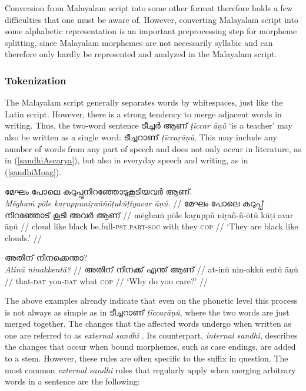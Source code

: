\documentclass[a4paper]{article}
\newcommand{\afx}[1]{\textsc{#1}}
\begin{document}
Conversion from Malayalam script into some other format therefore holds a few difficulties that one must be aware of. However, converting Malayalam script into some alphabetic representation is an important preprocessing step for morpheme splitting, since Malayalam morphemes are not necessarily syllabic and can therefore only hardly be represented and analyzed in the Malayalam script.

\subsubsection{Tokenization}

The Malayalam script generally separates words by whitespaces, just like the Latin script. However, there is a strong tendency to merge adjacent words in writing. Thus, the two-word sentence ടീച്ചർ ആണ് \textit{ṭīccar āṇŭ} `is a teacher' may also be written as a single word: ടീച്ചറാണ് \textit{ṭīccaṟāṇŭ}. This may include any number of words from any part of speech and does not only occur in literature, as in (\ref{sandhiAscarya}), but also in everyday speech and writing, as in (\ref{sandhiMoag}). %

\ex\label{sandhiAscarya}\begingl
\glpreamble മേഘം പോലെ കറുപ്പുനിറഞ്ഞോടുകൂടിയവർ ആണ്. \\
\textit{Mēghaṁ pōle kaṟuppuniṟaññōṭukūṭiyavar āṇŭ.} //
\gla മേഘം പോലെ കറുപ്പ് നിറഞ്ഞോട് കൂടി അവർ ആണ് //
\glb mēghaṁ pōle kaṟuppŭ niṟañ-ñ-ōṭŭ kūṭi avar āṇŭ //
\glc cloud like black be.full-\afx{pst.part}-\afx{soc} with they \afx{cop} //
\glft `They are black like clouds.' \parencite[p.~179]{ascaryacudamani} //
\endgl\xe


\ex\label{sandhiMoag}\begingl
\glpreamble അതിന് നിനക്കെന്താ? \\
\textit{Atinŭ ninakkentā?} //
\gla അതിന് നിനക്ക് എന്ത് ആണ് //
\glb at-inŭ nin-akkŭ entŭ āṇŭ //
\glc that-\afx{dat} you-\afx{dat} what \afx{cop} //
\glft `Why do you care?' \parencite[p.~165]{moag} //
\endgl\xe

The above examples already indicate that even on the phonetic level this process is not always as simple as in ടീച്ചറാണ് \textit{ṭīccaṟāṇŭ}, where the two words are just merged together. The changes that the affected words undergo when written as one are referred to as \textit{external sandhi} \parencite{devadath2014sandhi}. Its counterpart, \textit{internal sandhi}, describes the changes that occur when bound morphemes, such as case endings, are added to a stem. However, these rules are often specific to the suffix in question. The most common \textit{external sandhi} rules that regularly apply when merging arbitrary words in a sentence are the following:
\end{document}
